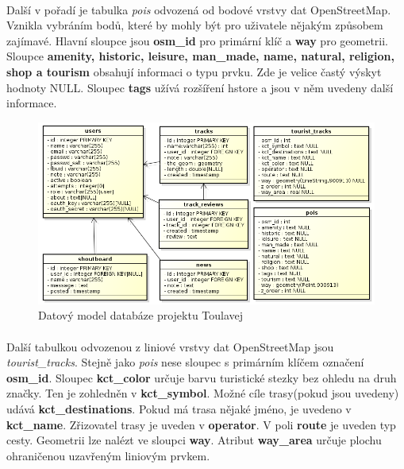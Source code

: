 \documentclass[11pt,a4paper,titlepage,oneside]{book}
\begin{document}
				\paragraph{}Další v pořadí je tabulka \textit{pois} odvozená od bodové vrstvy dat OpenStreetMap. Vznikla vybráním bodů, které by mohly být pro uživatele nějakým způsobem zajímavé. Hlavní sloupce jsou \textbf{osm\_id} pro primární klíč a \textbf{way} pro geometrii. Sloupce \textbf{amenity, historic, leisure, man\_made, name, natural, religion, shop a tourism} obsahují informaci o typu prvku. Zde je velice častý výskyt hodnoty NULL. Sloupec \textbf{tags} užívá rozšíření hstore a jsou v něm uvedeny další informace.
		\begin{figure}[!h]
			\begin{center}
				\includegraphics[width=13cm]{obrazky/datovy_model.png}
				\caption{Datový model databáze projektu Toulavej}
				\label{fig:db}
			\end{center}
		\end{figure}
                        \paragraph{} Další tabulkou odvozenou z liniové vrstvy dat OpenStreetMap jsou \textit{tourist\_tracks}. Stejně jako \textit{pois} nese sloupec s primárním klíčem označení \textbf{osm\_id}. Sloupec \textbf{kct\_color} určuje barvu turistické stezky bez ohledu na druh značky. Ten je zohledněn v \textbf{kct\_symbol}. Možné cíle trasy(pokud jsou uvedeny) udává \textbf{kct\_destinations}. Pokud má trasa nějaké jméno, je uvedeno v \textbf{kct\_name}. Zřizovatel trasy je uveden v \textbf{operator}. V poli \textbf{route} je uveden typ cesty. Geometrii lze nalézt ve sloupci \textbf{way}. Atribut \textbf{way\_area} určuje plochu ohraničenou uzavřeným liniovým prvkem.
\end{document}
